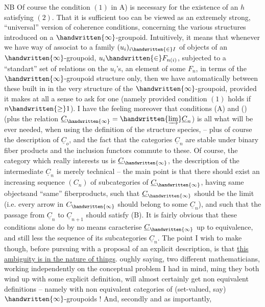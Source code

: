NB Of course the condition $(1)$ in A) is necessary for the existence of an $h$ satisfying $(2)$. That it is sufficient too can be viewed as an extremely strong, ``universal'' version of coherence conditions, concerning the various structures introduced on a $\handwritten{\infty}$-groupoid. Intuitively, it means that whenever we have  way of associat to a  family  $(u_i)_{i\handwritten{\in}I}$ of objects of an $\handwritten{\infty}$-groupoid, $u_i\handwritten{\in}F_{n(i)}$,  subjected to a ``standart'' set of relations on the $u_i$'s, an element of some $F_n$, in terms of the $\handwritten{\infty}$-groupoid structure only, then we have automatically  between these built in in the very structure of the $\handwritten{\infty}$-groupoid, provided it makes at all a sense to ask for one (namely provided condition $(1)$ holds if $n\handwritten{\geq}1$). I have the feeling moreover that conditions (A) and () (plus the relation $\underline{C}_{\handwritten{\infty}}=\handwritten{\varinjlim}\underline{C}_n$) is all what will be ever needed, when using the definition of the structure species, -- plus of course the description of $\underline{C}_o$, and the  fact that the categories $\underline{C}_n$ are stable under binary fiber products and  the inclusion functors commute to these.
Of course, the category which really interests us is $\underline{C}_{\handwritten{\infty}}$, the description of the intermediate $\underline{C}_n$ is merely technical  -- the main point is that there should exist an increasing sequence $(C_n)$ of subcategories of $\underline{C}_{\handwritten{\infty}}$, having same objects\handwritten{[}and ``same'' fiberproducts\handwritten{]}, such that $\underline{C}_{\handwritten{\infty}}$ should be the limit (i.e. every arrow in $C_{\handwritten{\infty}}$ should belong  to some $\underline{C}_n$), and such that the passage from $\underline{C}_n$ to $\underline{C}_{n+1}$ should satisfy (B). It is fairly obvious that these conditions alone do by no means caracterise $\underline{C}_{\handwritten{\infty}}$ up to equivalence, and still less the sequence of its subcategories $\underline{C}_n$. The point I wish to make though, before pursuing with a proposal of an explicit description, is that \uline{this ambiguity is in the nature of things}. oughly saying, two different mathematicians, working independently on the conceptual problem I had in mind, ming they both wind up with some explicit definition, will almost certainly get non equivalent definitions -- namely with non equivalent categories of (set-valued, say) $\handwritten{\infty}$-groupoids ! And, secondly and as importantly,

